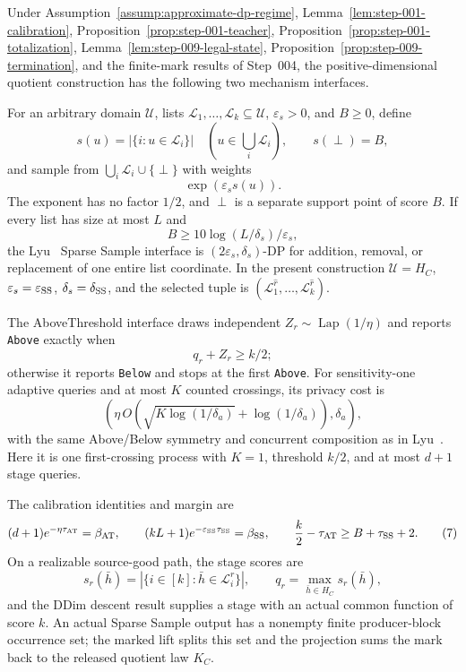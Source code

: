 \begin{proposition}\label{prop:step-010-interfaces}
Under Assumption~\ref{assump:approximate-dp-regime}, Lemma~\ref{lem:step-001-calibration}, Proposition~\ref{prop:step-001-teacher}, Proposition~\ref{prop:step-001-totalization}, Lemma~\ref{lem:step-009-legal-state}, Proposition~\ref{prop:step-009-termination}, and the finite-mark results of Step~004, the positive-dimensional quotient construction has the following two mechanism interfaces.

For an arbitrary domain \(\mathcal U\), lists
\(\mathcal L_1,\ldots,\mathcal L_k\subseteq\mathcal U\),
\(\varepsilon_s>0\), and \(B\ge0\), define
\[
 s(u)=|\{i:u\in\mathcal L_i\}|\quad
 (u\in\textstyle\bigcup_i\mathcal L_i),
 \qquad s(\perp)=B,
\]
and sample from \(\bigcup_i\mathcal L_i\cup\{\perp\}\) with weights
\[
 \exp(\varepsilon_s s(u)).
 \tag{5}
\]
The exponent has no factor \(1/2\), and \(\perp\) is a separate support
point of score \(B\).  If every list has size at most \(L\) and
\[
 B\geq10\log(L/\delta_s)/\varepsilon_s,
\]
the Lyu~\citep{lyu2025} Sparse Sample interface is
\((2\varepsilon_s,\delta_s)\)-DP for addition, removal, or replacement of
one entire list coordinate.  In the present construction
\(\mathcal U=H_C\), \(\varepsilon_s=\varepsilon_{\rm SS}\),
\(\delta_s=\delta_{\rm SS}\), and the selected tuple is
\((\mathcal L_1^{\widehat r},\ldots,\mathcal L_k^{\widehat r})\).

The AboveThreshold interface draws independent
\(Z_r\sim\operatorname{Lap}(1/\eta)\) and reports \texttt{Above} exactly
when
\[
 q_r+Z_r\geq k/2;
 \tag{6}
\]
otherwise it reports \texttt{Below} and stops at the first \texttt{Above}.
For sensitivity-one adaptive queries and at most \(K\) counted crossings,
its privacy cost is
\[
 \left(\eta\,O(\sqrt{K\log(1/\delta_a)}+\log(1/\delta_a)),
 \delta_a\right),
\]
with the same Above/Below symmetry and concurrent composition as in
Lyu~\citep{lyu2025}.  Here it is one first-crossing process with \(K=1\),
threshold \(k/2\), and at most \(d+1\) stage queries.

The calibration identities and margin are
\[
 (d+1)e^{-\eta\tau_{\rm AT}}=\beta_{\rm AT},
 \qquad
 (kL+1)e^{-\varepsilon_{\rm SS}\tau_{\rm SS}}=\beta_{\rm SS},
 \qquad
 \frac{k}{2}-\tau_{\rm AT}\geq B+\tau_{\rm SS}+2.
 \tag{7}
\]
On a realizable source-good path, the stage scores are
\[
 s_r(\bar h)=|\{i\in[k]:\bar h\in\mathcal L_i^r\}|,
 \qquad q_r=\max_{\bar h\in H_C}s_r(\bar h),
\]
and the DDim descent result supplies a stage with an actual common
function of score \(k\).  An actual Sparse Sample output has a nonempty
finite producer-block occurrence set; the marked lift splits this set and
the projection sums the mark back to the released quotient law \(K_C\).
\end{proposition}

